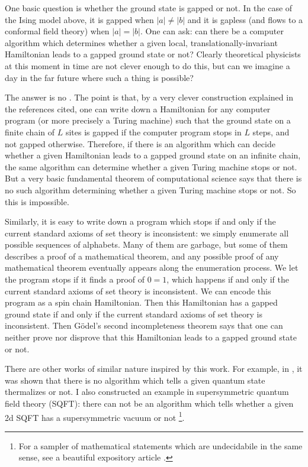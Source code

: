\documentclass[12pt]{article}
\numberwithin{equation}{section}
\numberwithin{figure}{section}
\theoremstyle{remark}
\begin{document}
One basic question is whether the ground state is gapped or not. 
In the case of the Ising model above, it is gapped when $|a|\neq |b|$ and it is gapless (and flows to a conformal field theory) when $|a|=|b|$.
One can ask: can there be a computer algorithm
which determines whether a given local, translationally-invariant Hamiltonian leads to a gapped ground state or not?
Clearly theoretical physicists at this moment in time are not clever enough to do this,
but can we imagine a day in the far future where such a thing is possible?

The answer is no \cite{2dNature,2dLong,1d}.
The point is that, by a very clever construction explained in the references cited,
one can write down a Hamiltonian for any computer program (or more precisely a Turing machine)
such that the ground state on a finite chain of $L$ sites is gapped 
if the computer program stops in $L$ steps,
and not gapped otherwise.
Therefore, if there is an algorithm which can decide whether a given Hamiltonian leads to a gapped ground state on an infinite chain,
the same algorithm can determine whether a given Turing machine stops or not.
But a very basic fundamental theorem of computational science says that
there is no such algorithm determining whether a given Turing machine stops or not.
So this is impossible.

Similarly, it is easy to write down a program which stops if and only if the current standard axioms of set theory is inconsistent: 
we simply enumerate all possible sequences of alphabets.
Many of them are garbage, but some of them describes a proof of a mathematical theorem,
and any possible proof of any mathematical theorem eventually appears along the enumeration process.
We let the program stops if it finds a proof of $0=1$, which happens if and only if the current standard axioms of set theory is inconsistent. 
We can encode this program as a spin chain Hamiltonian.
Then this Hamiltonian has a gapped ground state if and only if the current standard axioms of set theory is inconsistent. 
Then G\"odel's second incompleteness theorem says that one can neither prove nor disprove that this Hamiltonian leads to a gapped ground state or not.

There are other works of similar nature inspired by this work.
For example, in \cite{thermalNature,thermalLong}, it was shown that 
there is no algorithm which tells a given quantum state thermalizes or not.
I also constructed an example in supersymmetric quantum field theory (SQFT):
there can not be an algorithm which tells whether a given 2d SQFT has a supersymmetric vacuum or not \cite{Tachikawa:2022vsh}\footnote{%
For a sampler of mathematical statements which are undecidabile in the same sense,
see a beautiful expository article \cite{Poonen}.
}.
\end{document}
